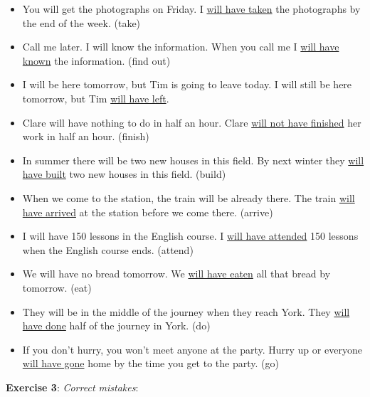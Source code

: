 \begin{itemize}

\item You will get the photographs on Friday. I \underline{will have taken} the photographs by the end of the week. (take)
\item Call me later. I will know the information. When you call me I \underline{will have known}  the information. (find out) 
\item I will be here tomorrow, but Tim is going to leave today. I will still be here tomorrow, but Tim \underline{will have left}.
\item Clare will have nothing to do in half an hour. Clare \underline{will not have finished} her work in half an hour. (finish)
\item In summer there will be two new houses in this field. By next winter they \underline{will have built} two new houses in this field. (build)  
\item When we come to the station, the train will be already there. The train \underline{will have arrived} at the station before we come there. (arrive) 
\item I will have 150 lessons in the English course. I \underline{will have attended} 150 lessons when the English course ends. (attend)
\item We will have no bread tomorrow. We \underline{will have eaten} all that bread by tomorrow. (eat)
\item They will be in the middle of the journey when they reach York. They \underline{will have done} half of the journey in York. (do)
\item If you don't hurry, you won't meet anyone at the party. \newline Hurry up or everyone \underline{will have gone} home by the time you get to the party. (go) 

\end{itemize}

\textbf{Exercise 3}: \textit{Correct mistakes}:

